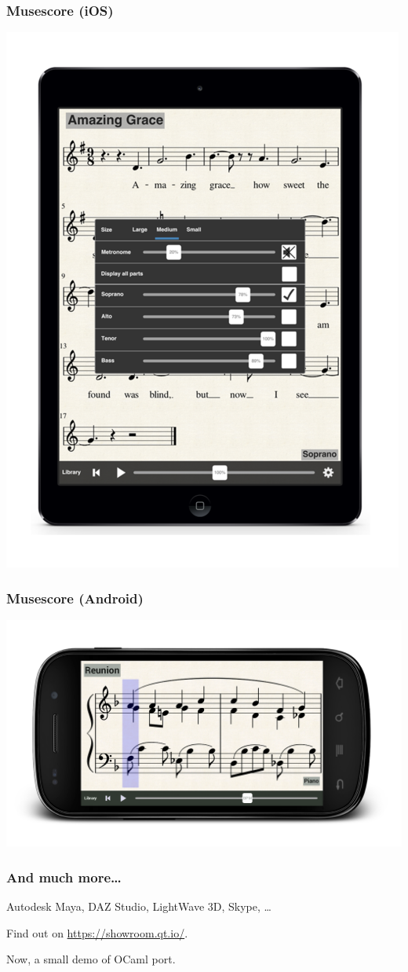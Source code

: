 \begin{frame}
  \frametitle{Musescore (iOS)}
  \center
  \includegraphics[height=0.9\textheight]{apps_musescore_ios}
\end{frame}

\begin{frame}
  \frametitle{Musescore (Android)}
  \includegraphics[width=\textwidth]{apps_musescore_android}
\end{frame}

\begin{frame}
  \frametitle{And much more\ldots}
  Autodesk Maya, DAZ Studio, LightWave 3D, Skype, \ldots
  \bigskip

  Find out on \href{https://showroom.qt.io/}{https://showroom.qt.io/}. \pause
  \bigskip

  Now, a small demo of OCaml port.

\end{frame}

